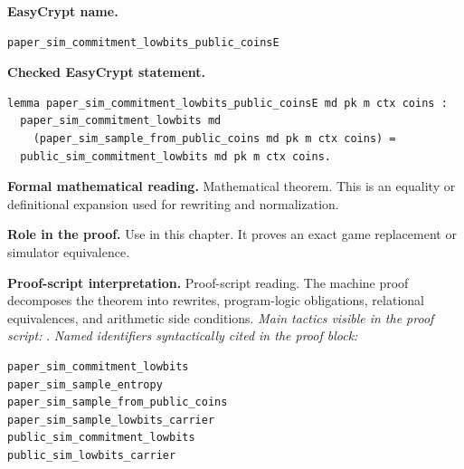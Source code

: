 \begin{formaltheorem}
\noindent\textbf{EasyCrypt name.}
\begin{lstlisting}[language=EasyCrypt,basicstyle=\ttfamily\scriptsize]
paper_sim_commitment_lowbits_public_coinsE
\end{lstlisting}
\noindent\textbf{Checked EasyCrypt statement.}
\begin{lstlisting}[language=EasyCrypt,basicstyle=\ttfamily\scriptsize]
lemma paper_sim_commitment_lowbits_public_coinsE md pk m ctx coins :
  paper_sim_commitment_lowbits md
    (paper_sim_sample_from_public_coins md pk m ctx coins) =
  public_sim_commitment_lowbits md pk m ctx coins.
\end{lstlisting}
\noindent\textbf{Formal mathematical reading.}
Mathematical theorem. This is an equality or definitional expansion used for rewriting and normalization.

\noindent\textbf{Role in the proof.}
Use in this chapter. It proves an exact game replacement or simulator equivalence.

\noindent\textbf{Proof-script interpretation.}
Proof-script reading. The machine proof decomposes the theorem into rewrites, program-logic obligations, relational equivalences, and arithmetic side conditions.
\emph{Main tactics visible in the proof script:} .
\emph{Named identifiers syntactically cited in the proof block:}
\begin{lstlisting}[language=EasyCrypt,basicstyle=\ttfamily\scriptsize]
paper_sim_commitment_lowbits
paper_sim_sample_entropy
paper_sim_sample_from_public_coins
paper_sim_sample_lowbits_carrier
public_sim_commitment_lowbits
public_sim_lowbits_carrier
\end{lstlisting}

\end{formaltheorem}

